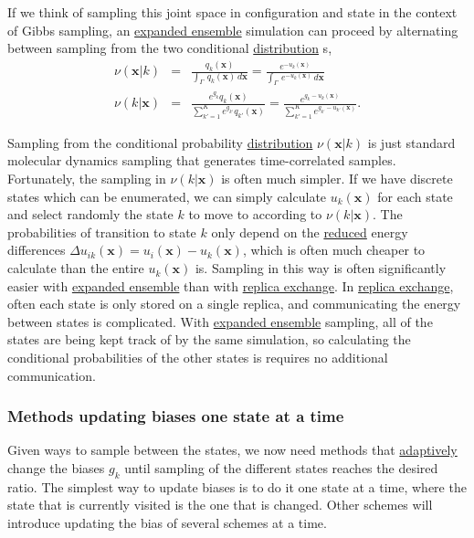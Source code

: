 \documentclass[9pt,review]{livecoms}
\newcommand{\vx}{\mathbf{x}}
\begin{document}
If we think of sampling this joint space in configuration and state in the context of Gibbs sampling, an \hyperlink{ref:ExpEns} {expanded ensemble} simulation can proceed by alternating between sampling from the two conditional \hyperlink{ref:Distribution} {distribution} s,
\begin{eqnarray}
\nu(\vx | k) &=& \frac{q_k(\vx)}{\int_\Gamma  \, q_k(\vx) \, d\vx}  = \frac{e^{-u_k(\vx)}}{\int_\Gamma  \, e^{-u_k(\vx)} \, d\vx }  \\
\nu(k | \vx) &=& \frac{e^{g_k}q_k(\vx)}{\sum\limits_{k'=1}^K e^{g_{k'}}q_{k'}(\vx)} = \frac{e^{g_k - u_k(\vx)}}{\sum\limits_{k'=1}^K e^{g_{k'} - u_{k'}(\vx)}} .\label{equation:expanded-ensemble-gibbs-update}
\end{eqnarray}

Sampling from the conditional probability \hyperlink{ref:Distribution} {distribution}
$\nu(\vx | k)$ is just standard molecular dynamics sampling that generates time-correlated samples. Fortunately, the sampling in $\nu(k | \vx)$ is often much simpler.   If we have
discrete states which can be enumerated, we can simply calculate
$u_k(\vx)$ for each state and select randomly the state $k$ to move to according to $\nu(k|\vx)$.  The
probabilities of transition to state $k$ only depend on the \hyperlink{ref:reduced} {reduced} energy differences $\Delta
u_{ik}(\vx) = u_i(\vx) - u_k(\vx)$, which is often much cheaper to calculate
than the entire $u_k(\vx)$ is. Sampling in this way is often significantly easier with \hyperlink{ref:ExpEns} {expanded ensemble} than with \hyperlink{ref:ReplEx} {replica exchange}. In \hyperlink{ref:ReplEx} {replica exchange}, often each state is only stored on a single replica, and communicating the energy between states is complicated. With \hyperlink{ref:ExpEns} {expanded ensemble} sampling, all of the states are being kept track of by the same simulation, so calculating the conditional probabilities of the other states is requires no additional communication.

\subsubsection{\label{sec:singlestate} Methods updating biases one state at a time}
Given ways to sample between the states, we now need methods that \hyperlink{ref:Adaptive} {adaptively} change the biases $g_k$ until sampling of the different states reaches the desired ratio. The simplest way to update biases is to do it one state at a time, where the state that is currently visited is the one that is changed. Other schemes will introduce updating the bias of several schemes at a time.
\end{document}
